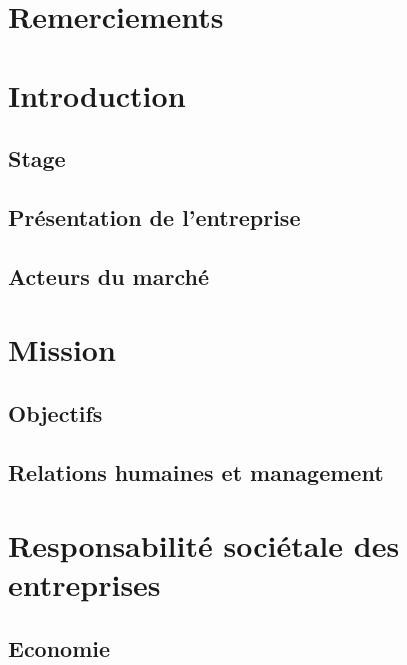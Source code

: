 \documentclass[11pt, oneside, a4paper, titlepage]{report}
\begin{document}
\begin{titlepage}
    
\end{titlepage}

\tableofcontents



\chapter{Remerciements}%
\label{cha:ackn}

\chapter{Introduction}%
\label{cha:intro}

\section{Stage}%
\label{sec:intro-stage}

\section{Présentation de l'entreprise}%
\label{sec:intro-entreprise}

\section{Acteurs du marché}%
\label{sec:intro-acteurs}

\chapter{Mission}%
\label{cha:mission}

\section{Objectifs}%
\label{sec:mission-objectifs}

\section{Relations humaines et management}%
\label{sec:mission-rhm}

\chapter{Responsabilité sociétale des entreprises}%
\label{cha:rse}

\section{Economie}%
\label{sec:rse-eco}
\end{document}
